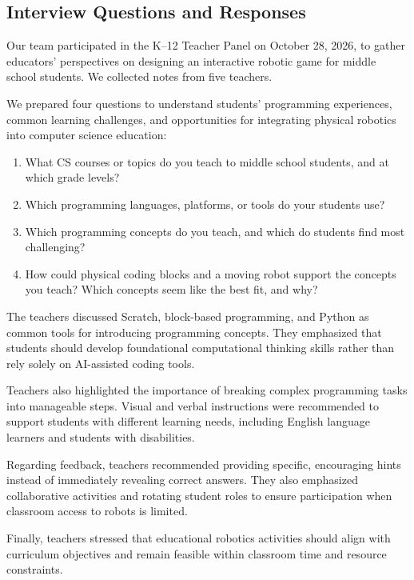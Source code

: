 \documentclass[conference]{IEEEtran}
\begin{document}
\subsection{Interview Questions and Responses}

Our team participated in the K--12 Teacher Panel on October 28, 2026, to gather educators' perspectives on designing an interactive robotic game for middle school students. We collected notes from five teachers.

We prepared four questions to understand students' programming experiences, common learning challenges, and opportunities for integrating physical robotics into computer science education:

\begin{enumerate}
    \item What CS courses or topics do you teach to middle school students, and at which grade levels?
    \item Which programming languages, platforms, or tools do your students use?
    \item Which programming concepts do you teach, and which do students find most challenging?
    \item How could physical coding blocks and a moving robot support the concepts you teach? Which concepts seem like the best fit, and why?
\end{enumerate}

The teachers discussed Scratch, block-based programming, and Python as common tools for introducing programming concepts. They emphasized that students should develop foundational computational thinking skills rather than rely solely on AI-assisted coding tools.

Teachers also highlighted the importance of breaking complex programming tasks into manageable steps. Visual and verbal instructions were recommended to support students with different learning needs, including English language learners and students with disabilities.

Regarding feedback, teachers recommended providing specific, encouraging hints instead of immediately revealing correct answers. They also emphasized collaborative activities and rotating student roles to ensure participation when classroom access to robots is limited.

Finally, teachers stressed that educational robotics activities should align with curriculum objectives and remain feasible within classroom time and resource constraints.
\end{document}
